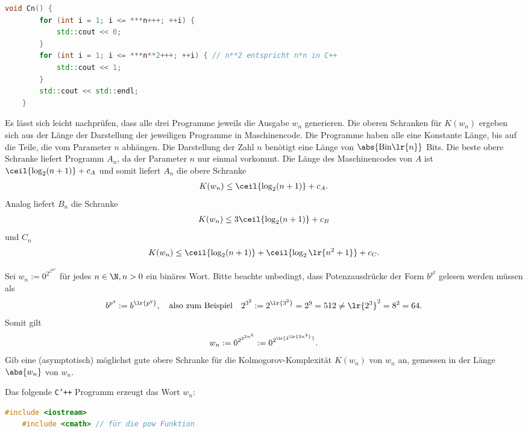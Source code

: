 \begin{questions}
\begin{lstlisting}[language=C++,caption=$C_n$,label=listing:Cn]
    void Cn() {
        for (int i = 1; i <= ***n+++; ++i) {
            std::cout << 0;
        }
        for (int i = 1; i <= ***n**2+++; ++i) { // n**2 entspricht n*n in C++ 
            std::cout << 1;
        }
        std::cout << std::endl;
    }
\end{lstlisting}
	\begin{solution}
		Es lässt sich leicht nachprüfen, dass alle drei Programme jeweils die Ausgabe $w_n$ generieren. Die oberen Schranken für $K(w_n)$ ergeben sich aus der Länge der Darstellung der jeweiligen Programme in Maschinencode. Die Programme haben alle eine Konstante Länge, bis auf die Teile, die vom Parameter $n$ abhängen. Die Darstellung der Zahl $n$ benötigt eine Länge von $\abs{\text{Bin}\lr{n}}$ Bits. Die beste obere Schranke liefert Programm $A_n$, da der Parameter $n$ nur einmal vorkommt. Die Länge des Maschinencodes von $A$ ist $\ceil{\log_2(n+1)} + c_A$ und somit liefert $A_n$ die obere Schranke
		\begin{align*}
			K(w_n) \leq \ceil{\log_2(n+1)} + c_A.
		\end{align*}
		Analog liefert $B_n$ die Schranke
		\begin{align*}
			K(w_n) \leq 3\ceil{\log_2(n+1)} + c_B
		\end{align*}
		und $C_n$
		\begin{align*}
			K(w_n) \leq \ceil{\log_2(n+1)} + \ceil{\log_2\lr{n^2+1}} + c_C.
		\end{align*}
	\end{solution}


	\question[2] Sei $w_n := 0^{2^{2^{2n^4}}}$ für jedes $n\in\N, n>0$ ein binäres Wort. Bitte beachte unbedingt, dass Potenzausdrücke der Form $b^{p^q}$ gelesen werden müssen als
	\begin{align*}
		b^{p^q} := b^{\lr{p^q}}, \quad \text{also zum Beispiel} \quad 2^{3^2} := 2^{\lr{3^2}} = 2^9 = 512 \neq \lr{2^3}^2 = 8^2 = 64.
	\end{align*}
	Somit gilt
	\begin{align*}
		w_n := 0^{2^{2^{2n^4}}} := 0^{2^{\lr{2^{\lr{2n^4}}}}}.
	\end{align*}
	Gib eine (asymptotisch) möglichst gute obere Schranke für die Kolmogorov-Komplexität $K(w_n)$ von $w_n$ an, gemessen in der Länge $\abs{w_n}$ von $w_n$.
	\begin{solution}
		Das folgende \texttt{C'++} Programm erzeugt das Wort $w_n$:
		\begin{lstlisting}[language=C++,caption=$W_n$]
    #include <iostream>
    #include <cmath> // für die pow Funktion
    

\end{lstlisting}
\end{solution}
\end{questions}
